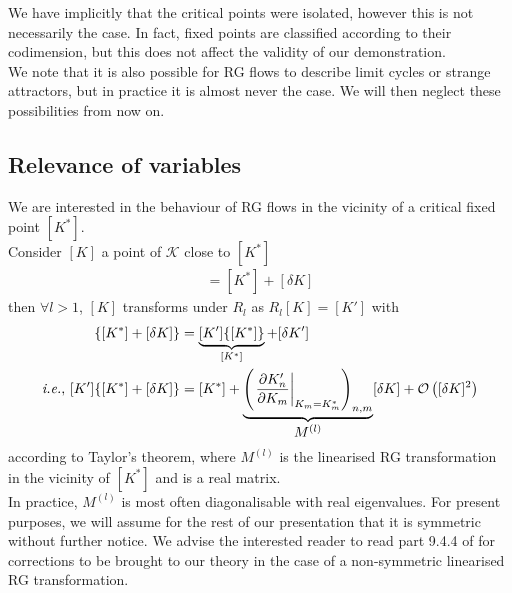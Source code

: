 \documentclass[class=report, float=false, crop=false]{standalone}
\begin{document}
We have implicitly that the critical points were isolated, however this is not necessarily the case. In fact, fixed points are classified according to their codimension, but this does not affect the validity of our demonstration.\\

We note that it is also possible for RG flows to describe limit cycles or strange attractors, but in practice it is almost never the case. We will then neglect these possibilities from now on.

\subsection{Relevance of variables}

We are interested in the behaviour of RG flows in the vicinity of a critical fixed point $[K^*]$.\\

Consider $[K]$ a point of $\mathcal{K}$ close to $[K^*]$
\begin{align*}
[K] = [K^*] + [\delta K]
\end{align*}
then $\forall l>1$, $[K]$ transforms under $R_l$ as $R_l[K]=[K']$ with
\begin{align*}
[K']\{[K^*]+[\delta K]\} &= \underbrace{[K']\{[K^*]\}}_{[K^*]} + [\delta K']\\
\text{\textit{i.e.}, } [K']\{[K^*]+[\delta K]\} &= [K^*] + \underbrace{\left(\left.\frac{\partial K'_n}{\partial K_m}\right|_{K_m = K^*_m} \right)_{n,m}}_{\textstyle M^{(l)}} [\delta K] + \mathcal{O}\left([\delta K]^2\right)
\end{align*}
according to Taylor's theorem, where $M^{(l)}$ is the linearised RG transformation in the vicinity of $[K^*]$ and is a real matrix.\\

In practice, $M^{(l)}$ is most often diagonalisable with real eigenvalues. For present purposes, we will assume for the rest of our presentation that it is symmetric without further notice. We advise the interested reader to read part 9.4.4 of \cite{goldenfeld1992lectures} for corrections to be brought to our theory in the case of a non-symmetric linearised RG transformation.\\
\end{document}
